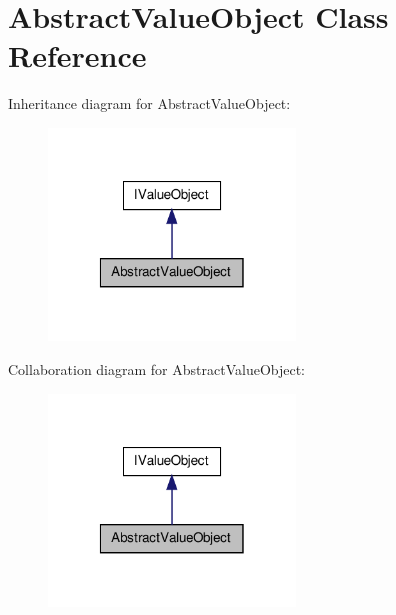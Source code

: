 \hypertarget{class_sec_plus_1_1_abstract_value_object}{
\section{AbstractValueObject Class Reference}
\label{class_sec_plus_1_1_abstract_value_object}
}


Inheritance diagram for AbstractValueObject:\nopagebreak
\begin{figure}[H]
\begin{center}
\leavevmode
\includegraphics[width=186pt]{class_sec_plus_1_1_abstract_value_object__inherit__graph}
\end{center}
\end{figure}


Collaboration diagram for AbstractValueObject:\nopagebreak
\begin{figure}[H]
\begin{center}
\leavevmode
\includegraphics[width=186pt]{class_sec_plus_1_1_abstract_value_object__coll__graph}
\end{center}
\end{figure}
